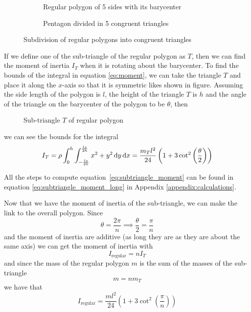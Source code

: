 \begin{figure}[H]
	\centering
	\hfill
	\begin{subfigure}[]{.45\textwidth}
		\centering
		\caption{Regular polygon of 5 sides with its barycenter}
		\label{fig:pentagon}
	\end{subfigure}
	\hfill
	\begin{subfigure}[]{.45\textwidth}
		\centering
		\caption{Pentagon divided in 5 congruent triangles}
		\label{fig:pentagon_triangles}
	\end{subfigure}
	\hfill\null
	\caption{Subdivision of regular polygons into congruent triangles}
	\label{fig:regular_poly}
\end{figure}

If we define one of the sub-triangle of the regular polygon as $T$, then we can
find the moment of inertia $I_T$ when it is rotating about the barycenter. To
find the bounds of the integral in equation \ref{eq:moment}, we can take the
triangle $T$ and place it along the $x$-axis so that it is symmetric likes shown
in figure. Assuming the side length of the polygon is $l$, the height of the
triangle $T$ is $h$ and the angle of the triangle on the barycenter of the
polygon to be $\theta$, then
\begin{figure}[H]
	\centering
	\caption{Sub-triangle $T$ of regular polygon}
	\label{fig:subtriangle}
\end{figure}
we can see the bounds for the integral
\begin{equation}
	\label{eq:subtriangle_moment}
	I_{T} = \rho \int_0^h\int_{-\frac{lx}{2h}}^{\frac{lx}{2h}}x^2 + y^2 \mathop{}\!\mathrm{d}
	y\mathop{}\!\mathrm{d} x= \frac{m_Tl^2}{24} \left(1 + 3\cot^2\left(\frac{\theta}{2}\right)\right)
\end{equation}

All the steps to compute equation~\ref{eq:subtriangle_moment} can be found in
equation \ref{eq:subtriangle_moment_long} in Appendix
\ref{appendix:calculations}.

Now that we have the moment of inertia of the sub-triangle, we can make the link
to the overall polygon. Since
$$ \theta = \frac{2\pi}{n} \implies \frac{\theta}{2} = \frac{\pi}{n} $$
and the moment of inertia are additive (as long they are as they are about the
same axis) we can get the moment of inertia with
$$ I_{\text{regular}} = n I_T $$
and since the mass of the regular polygon $m$ is the sum of the masses of the
sub-triangle
$$ m = n m_T $$
we have that
\begin{equation}
	\label{eq:regular_moment}
	I_{\text{regular}} = \frac{ml^2}{24} \left( 1 + 3\cot^2\left(\frac{\pi}{n}\right) \right)
\end{equation}

